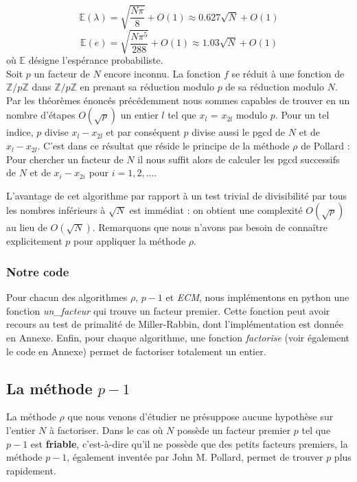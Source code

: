 \documentclass[11pt,a4paper]{article}
\begin{document}
\begin{equation}
	\mathbb{E}(\lambda) = \sqrt { \frac{N\pi}{8} } + O(1) \approx 0.627 \sqrt N + O(1) \nonumber
\end{equation}	
\begin{equation}
	\mathbb{E}(e) = \sqrt { \frac{N\pi^5}{288} } + O(1) \approx 1.03 \sqrt N + O(1) \nonumber
\end{equation}	
où $\mathbb{E}$ désigne l'espérance probabiliste. \\

Soit $p$ un facteur de $N$ encore inconnu. La fonction $f$ se réduit à une fonction de $\mathbb{Z}/p\mathbb{Z}$ dans $\mathbb{Z}/p\mathbb{Z}$ en prenant sa réduction modulo $p$ de sa réduction modulo $N$. Par les théorèmes énoncés précédemment nous sommes capables de trouver en un nombre d'étapes $O(\sqrt p)$ un entier $l$ tel que $x_l$ = $x_{2l}$ modulo $p$. Pour un tel indice, $p$ divise $x_l-x_{2l}$ et par conséquent $p$ divise aussi le pgcd de $N$ et de $x_l-x_{2l}$. C'est dans ce résultat que réside le principe de la méthode $\rho$ de Pollard : Pour chercher un facteur de $N$ il nous suffit alors de calculer les pgcd successifs de $N$ et de $x_i-x_{2i}$ pour $i=1, 2, \ldots$.
	
L'avantage de cet algorithme par rapport à un test trivial de divisibilité par tous les nombres inférieurs à $\sqrt{N}$ est immédiat : on obtient une complexité $O(\sqrt{p})$ au lieu de $O(\sqrt{N})$. Remarquons que nous n'avons pas besoin de connaître explicitement $p$ pour appliquer la méthode $\rho$.

\subsubsection{Notre code}
Pour chacun des algorithmes $\rho$, $p-1$ et \textit{ECM}, nous implémentons en python une fonction \textit{un\_facteur} qui trouve un facteur premier. Cette fonction peut avoir recours au test de primalité de Miller-Rabbin, dont l'implémentation est donnée en Annexe. Enfin, pour chaque algorithme, une fonction \textit{factorise} (voir également le code en Annexe) permet de factoriser totalement un entier. 



\subsection{La méthode $p-1$}
La méthode $\rho$ que nous venons d'étudier ne présuppose aucune hypothèse sur l'entier $N$ à factoriser. Dans le cas où $N$ possède un facteur premier $p$ tel que $p-1$ est \textbf{friable}, c'est-à-dire qu'il ne possède que des petits facteurs premiers, la méthode $p-1$, également inventée par John M. Pollard, permet de trouver $p$ plus rapidement.
\end{document}

